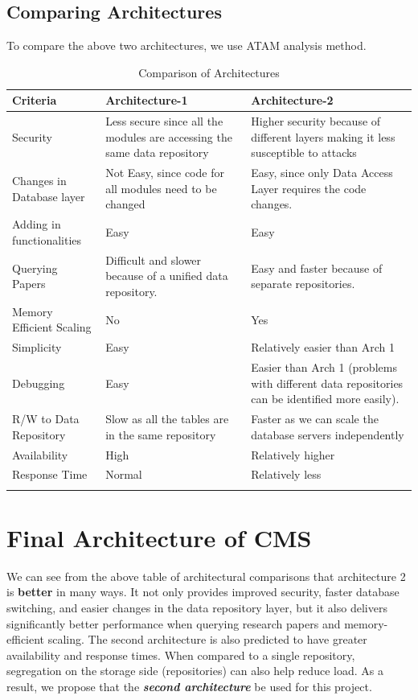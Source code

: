 \documentclass[english,a4paper,12pt]{report}
\begin{document}
\newpage
\section{Comparing Architectures}
To compare the above two architectures, we use ATAM analysis method. 
\begin{longtable}{ |M{3cm}|M{7cm}|M{7cm}|}
\hline 
\textbf{Criteria} & \textbf{Architecture-1} & \textbf{Architecture-2} \\ 
\hline 
Security & Less secure since all the modules are accessing the same data repository & Higher security because of different layers making it less susceptible to attacks\\ 
\hline 
Changes in Database layer & Not Easy, since code for all
modules need to be changed & Easy, since only Data Access Layer
requires the code changes. \\ 
\hline 
Adding in functionalities & Easy & Easy \\
\hline 
Querying Papers & Difficult and slower because
of a unified data repository. & Easy and faster because of
separate repositories. \\ 
\hline 
Memory Efficient Scaling & No & Yes \\ 
\hline 
Simplicity & Easy& Relatively easier than Arch 1 \\ 
\hline 
Debugging & Easy & Easier than Arch 1 (problems with different data repositories can be identified more easily). \\ 
\hline
R/W to Data Repository & Slow as all the tables are in the same repository  & Faster as we can scale the database servers independently\\ 
\hline 
Availability & High & Relatively higher\\ 
\hline 
Response Time & Normal & Relatively less \\ 
\hline 
 \caption{Comparison of Architectures}
    \label{tab:comparision}
\end{longtable}

\begingroup
\let\clearpage\relax
\chapter{Final Architecture of CMS}
\endgroup
We can see from the above table of architectural comparisons that architecture 2 is \textbf{better} in many ways. It not only provides improved security, faster database switching, and easier changes in the data repository layer, but it also delivers significantly better performance when querying research papers and memory-efficient scaling. The second architecture is also predicted to have greater availability and response times. When compared to a single repository, segregation on the storage side (repositories) can also help reduce load. As a result, we propose that the \textbf{\textit{second architecture}} be used for this project.
\end{document}
